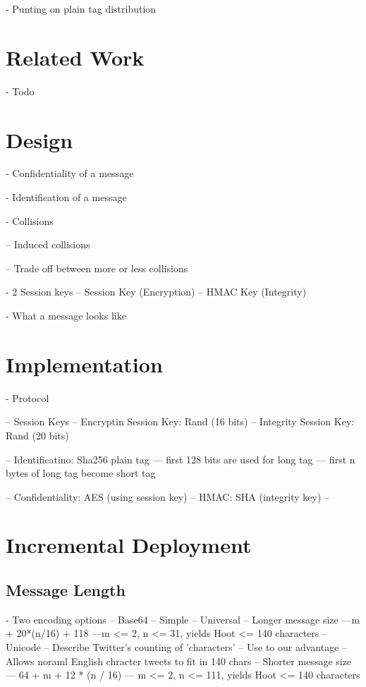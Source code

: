 \documentclass{acm_proc_article-sp}
\begin{document}
- Punting on plain tag distribution

\section{Related Work}

- Todo

\section{Design}

- Confidentiality of a message

- Identification of a message

- Collisions

-- Induced collisions

-- Trade off between more or less collisions

- 2 Session keys
-- Session Key (Encryption)
-- HMAC Key (Integrity)

- What a message looks like

\section{Implementation}

- Protocol

-- Session Keys
-- Encryptin Session Key: Rand (16 bits)
-- Integrity Session Key: Rand (20 bits)

-- Identificatino: Sha256 plain tag
--- first 128 bits are used for long tag
--- first n bytes of long tag become short tag

-- Confidentiality: AES (using session key)
-- HMAC: SHA (integrity key)
-- 

\section{Incremental Deployment}

\subsection{Message Length}

- Two encoding options
-- Base64
	-- Simple
	-- Universal
	-- Longer message size 
		---m + 20*(n/16) + 118 
		---m <= 2, n <= 31, yields Hoot <= 140 characters
-- Unicode
	-- Describe Twitter's counting of 'characters'
	-- Use to our advantage
	-- Allows noraml English chracter tweets to fit in 140 chars
	-- Shorter message size
	--- 64 + m + 12 * (n / 16)
	--- m <= 2, n <= 111, yields Hoot <= 140 characters
\end{document}
